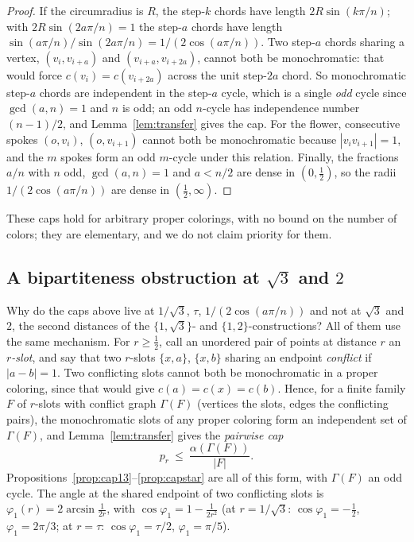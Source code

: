 \documentclass[11pt]{article}
\theoremstyle{definition}
\theoremstyle{remark}
\begin{document}
\begin{proof}
If the circumradius is $R$, the step-$k$ chords have length
$2R\sin(k\pi/n)$; with $2R\sin(2a\pi/n)=1$ the step-$a$ chords have
length $\sin(a\pi/n)/\sin(2a\pi/n)=1/(2\cos(a\pi/n))$.
Two step-$a$ chords sharing a vertex, $(v_i,v_{i+a})$ and
$(v_{i+a},v_{i+2a})$, cannot both be monochromatic: that would force
$c(v_i)=c(v_{i+2a})$ across the unit step-$2a$ chord.  So monochromatic
step-$a$ chords are independent in the step-$a$ cycle, which is a
single \emph{odd} cycle since $\gcd(a,n)=1$ and $n$ is odd; an odd
$n$-cycle has independence number $(n-1)/2$, and
Lemma~\ref{lem:transfer} gives the cap.  For the flower, consecutive
spokes $(o,v_i)$, $(o,v_{i+1})$ cannot both be monochromatic because
$|v_iv_{i+1}|=1$, and the $m$ spokes form an odd $m$-cycle under this
relation.  Finally, the fractions $a/n$ with $n$ odd, $\gcd(a,n)=1$ and
$a<n/2$ are dense in $(0,\tfrac12)$, so the radii $1/(2\cos(a\pi/n))$
are dense in $(\tfrac12,\infty)$.
\end{proof}

These caps hold for arbitrary proper colorings, with no bound on the
number of colors; they are elementary, and we do not claim priority for
them.

\subsection{A bipartiteness obstruction at $\sqrt3$ and $2$}

Why do the caps above live at $1/\sqrt3$, $\tau$, $1/(2\cos(a\pi/n))$
and not at $\sqrt3$ and $2$, the second distances of the
$\{1,\sqrt3\}$- and $\{1,2\}$-constructions?  All
of them use the same mechanism.  For $r\ge\tfrac12$, call an unordered
pair of points at distance $r$ an \emph{$r$-slot}, and say that two
$r$-slots $\{x,a\}$, $\{x,b\}$ sharing an endpoint \emph{conflict} if
$|a-b|=1$.  Two conflicting slots cannot both be monochromatic in a
proper coloring, since that would give $c(a)=c(x)=c(b)$.  Hence, for a
finite family $F$ of $r$-slots with conflict graph $\Gamma(F)$ (vertices
the slots, edges the conflicting pairs), the monochromatic slots of any
proper coloring form an independent set of $\Gamma(F)$, and
Lemma~\ref{lem:transfer} gives the \emph{pairwise cap}
\[
  p_r\ \le\ \frac{\alpha(\Gamma(F))}{|F|}.
\]
Propositions~\ref{prop:cap13}--\ref{prop:capstar} are all of this form,
with $\Gamma(F)$ an odd cycle.  The angle at the shared endpoint of two
conflicting slots is $\varphi_1(r)=2\arcsin\frac1{2r}$, with
$\cos\varphi_1=1-\tfrac1{2r^2}$ (at $r=1/\sqrt3$:
$\cos\varphi_1=-\tfrac12$, $\varphi_1=2\pi/3$; at $r=\tau$:
$\cos\varphi_1=\tau/2$, $\varphi_1=\pi/5$).
\end{document}
